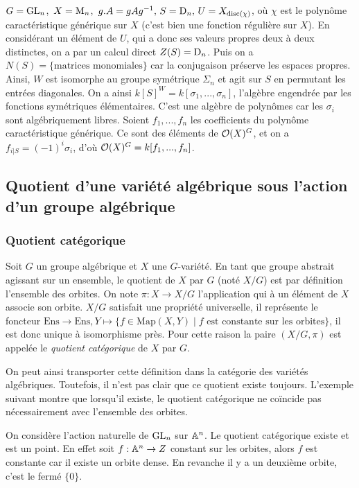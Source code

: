 \begin{ex}
$G=\operatorname{GL}_n$,\, $X=\operatorname{M}_n$,\, $g.A=gAg^{-1},\, S=\operatorname{D}_n,\, U=X_{\operatorname{disc}(\chi )}$, où $\chi$ est le polynôme caractéristique générique sur $X$ (c'est bien une fonction régulière sur $X$). En considérant un élément de $U$, qui a donc ses valeurs propres deux à deux distinctes, on a par un calcul direct $Z(S)=\operatorname{D}_n$. Puis on a $N(S)=\lbrace\textrm{matrices monomiales}\rbrace$ car la conjugaison préserve les espaces propres. Ainsi, $W$ est isomorphe au groupe symétrique $\Sigma_n$ et agit sur $S$ en permutant les entrées diagonales. On a ainsi $k[S]^W=k[\sigma_1,...,\sigma _n]$, l'algèbre engendrée par les fonctions symétriques élémentaires. C'est une algèbre de polynômes car les $\sigma_i$ sont algébriquement libres. Soient $f_1,...,f_n$ les coefficients du polynôme caractéristique générique. Ce sont des éléments de $\mathcal{O}(X)^G$, et on a $f_{i| S}=(-1)^i\sigma _i$, d'où $\mathcal{O}(X)^G=k[f_1,...,f_n]$.
\end{ex}

\subsection{Quotient d'une variété algébrique sous l'action d'un groupe algébrique}

\subsubsection{Quotient catégorique}

Soit $G$ un groupe algébrique et $X$ une $G$-variété. En tant que groupe abstrait agissant sur un ensemble, le quotient de $X$ par $G$ (noté $X/G$) est par définition l'ensemble des orbites. On note $\pi:X \rightarrow X/G$ l'application qui à un élément de $X$ associe son orbite. $X/G$ satisfait une propriété universelle, il représente le foncteur $\textrm{Ens}\rightarrow \textrm{Ens}, Y\mapsto \lbrace f\in \textrm{Map}(X, Y)\mid f \textrm{ est constante sur les orbites} \rbrace$, il est donc unique à isomorphisme près. Pour cette raison la paire $(X
/G, \pi)$ est appelée le \textit{quotient catégorique} de $X$ par $G$.

On peut ainsi transporter cette définition dans la catégorie des variétés algébriques. Toutefois, il n'est pas clair que ce quotient existe toujours. L'exemple suivant montre que lorsqu'il existe, le quotient catégorique ne coïncide pas nécessairement avec l'ensemble des orbites.

\begin{ex}
On considère l'action naturelle de $\operatorname{GL}_n$ sur $\mathbb{A}^n$. Le quotient catégorique existe et est un point. En effet soit $f:\mathbb{A}^n\rightarrow Z$ constant sur les orbites, alors $f$ est constante car il existe un orbite dense. En revanche il y a un deuxième orbite, c'est le fermé $\lbrace 0\rbrace$. 
\end{ex}

